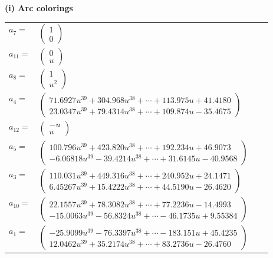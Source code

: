 \documentclass[1p]{elsarticle_modified}
\theoremstyle{definition}
\begin{document}
\flushleft \textbf{(i) Arc colorings}\\
\begin{tabular}{m{7pt} m{180pt} m{7pt} m{180pt} }
\flushright $a_{7}=$&$\begin{pmatrix}1\\0\end{pmatrix}$ \\
\flushright $a_{11}=$&$\begin{pmatrix}0\\u\end{pmatrix}$ \\
\flushright $a_{8}=$&$\begin{pmatrix}1\\u^2\end{pmatrix}$ \\
\flushright $a_{4}=$&$\begin{pmatrix}71.6927 u^{39}+304.968 u^{38}+\cdots+113.975 u+41.4180\\23.0347 u^{39}+79.4314 u^{38}+\cdots+109.874 u-35.4675\end{pmatrix}$ \\
\flushright $a_{12}=$&$\begin{pmatrix}- u\\u\end{pmatrix}$ \\
\flushright $a_{5}=$&$\begin{pmatrix}100.796 u^{39}+423.820 u^{38}+\cdots+192.234 u+46.9073\\-6.06818 u^{39}-39.4214 u^{38}+\cdots+31.6145 u-40.9568\end{pmatrix}$ \\
\flushright $a_{3}=$&$\begin{pmatrix}110.031 u^{39}+449.316 u^{38}+\cdots+240.952 u+24.1471\\6.45267 u^{39}+15.4222 u^{38}+\cdots+44.5190 u-26.4620\end{pmatrix}$ \\
\flushright $a_{10}=$&$\begin{pmatrix}22.1557 u^{39}+78.3082 u^{38}+\cdots+77.2236 u-14.4993\\-15.0063 u^{39}-56.8324 u^{38}+\cdots-46.1735 u+9.55384\end{pmatrix}$ \\
\flushright $a_{1}=$&$\begin{pmatrix}-25.9099 u^{39}-76.3397 u^{38}+\cdots-183.151 u+45.4235\\12.0462 u^{39}+35.2174 u^{38}+\cdots+83.2736 u-26.4760\end{pmatrix}$ \\

\end{tabular}
\end{document}
